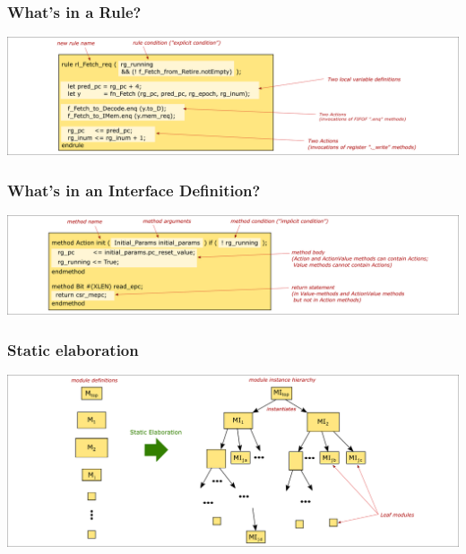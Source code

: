 
\begin{frame}
\frametitle{What's in a Rule?}

\begin{center}
\includegraphics[width=\textwidth]{../Figures/Fig_BSV_whats_in_a_rule}
\end{center}

\end{frame}


\begin{frame}
\frametitle{What's in an Interface Definition?}

\begin{center}
\includegraphics[width=\textwidth]{../Figures/Fig_BSV_whats_in_an_interface_def}
\end{center}

\end{frame}


\begin{frame}
\frametitle{Static elaboration}

\begin{center}
\includegraphics[width=\textwidth]{../Figures/Fig_BSV_static_elaboration}
\end{center}

\end{frame}

